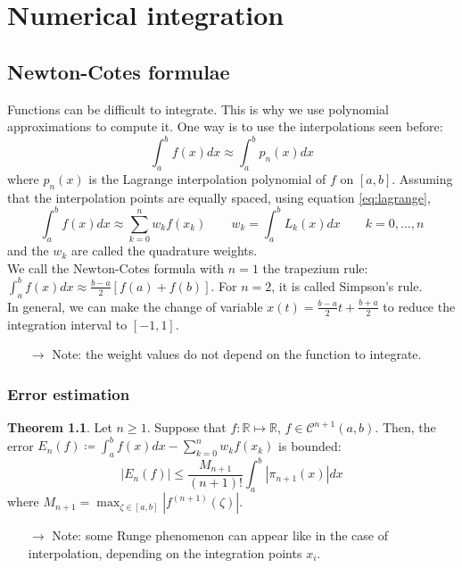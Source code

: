 \documentclass[12pt, openany]{report}
\newcommand{\R}{\mathbb{R}}
\theoremstyle{definition}
\newtheorem{thm}{Theorem}[chapter]
\begin{document}
\chapter{Numerical integration}
\section{Newton-Cotes formulae}
Functions can be difficult to integrate. This is why we use polynomial approximations to compute it. One way is to use the interpolations seen before: 
\begin{equation}
    \int_a^b f(x)dx \approx \int_a^b p_n(x)dx
\end{equation}
where $p_n(x)$ is the Lagrange interpolation polynomial of $f$ on $[a,b]$. Assuming that the interpolation points are equally spaced, using equation \eqref{eq:lagrange},
\begin{equation}
    \int_a^b f(x)dx \approx \sum_{k=0}^n w_kf(x_k)\qquad w_k = \int_a^b L_k(x)dx \qquad k=0,\dots,n
\end{equation}
and the $w_k$ are called the quadrature weights. \\
We call the Newton-Cotes formula with $n=1$ the trapezium rule: $\int_a^b f(x)dx \approx \frac{b-a}{2}[f(a)+f(b)]$. For $n=2$, it is called Simpson's rule.\\

In general, we can make the change of variable $x(t) = \frac{b-a}{2}t+\frac{b+a}{2}$ to reduce the integration interval to $[-1,1]$. 
\begin{itemize}
    \item [$\rightarrow$] Note: the weight values do not depend on the function to integrate.
\end{itemize}
\subsection{Error estimation}
\begin{thm}
    Let $n\ge 1$. Suppose that $f:\R\mapsto\R$, $f\in \mathcal{C}^{n+1}(a,b)$. Then, the error $E_n(f) \coloneqq \int_a^b f(x)dx-\sum_{k=0}^n w_kf(x_k)$ is bounded:
    \begin{equation}
        |E_n(f)| \le \frac{M_{n+1}}{(n+1)!}\int_a^b |\pi_{n+1}(x)|dx
    \end{equation}
    where $M_{n+1} = \max_{\zeta\in[a,b]}|f^{(n+1)}(\zeta)|$. 
\end{thm}
\begin{itemize}
    \item [$\rightarrow$] Note: some Runge phenomenon can appear like in the case of interpolation, depending on the integration points $x_i$. 
\end{itemize}
\end{document}
